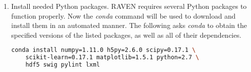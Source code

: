 \begin{enumerate}
\begin{lstlisting}[language=bash, basicstyle=\tiny]
\end{lstlisting}

	\item Install needed Python packages.  RAVEN requires several Python packages to function properly.
		Now the {\it conda} command will be used to download and install them in an automated manner. The
		following asks {\it conda} to obtain the specified versions of the listed packages, as well as all
		of their dependencies.
		\smallskip

\begin{lstlisting}[language=bash]
conda install numpy=1.11.0 h5py=2.6.0 scipy=0.17.1 \
	scikit-learn=0.17.1 matplotlib=1.5.1 python=2.7 \
	hdf5 swig pylint lxml
\end{lstlisting}

\end{enumerate}

